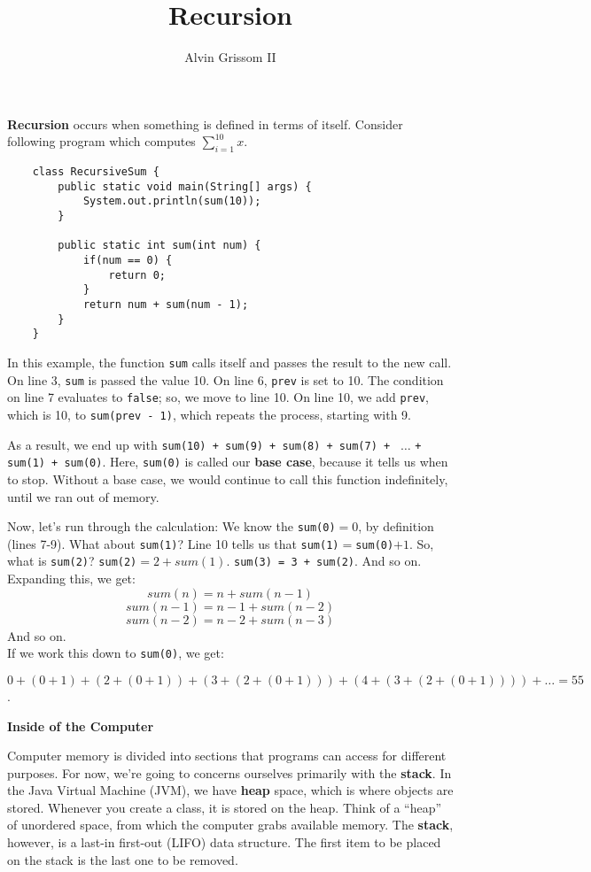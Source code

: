 \documentclass[12pt]{article}
\title{Recursion}
\author{Alvin Grissom II}
\begin{document}
\maketitle

\textbf{Recursion} occurs when something is defined in terms of
itself. Consider following program which computes $\sum_{i=1}^{10} x$.
\begin{verbatim}
    class RecursiveSum {
        public static void main(String[] args) {
            System.out.println(sum(10));
        }
        
        public static int sum(int num) {
            if(num == 0) {
	            return 0;
            }
            return num + sum(num - 1);
        }
    }
\end{verbatim}
In this example, the function \texttt{sum} calls itself and passes the
result to the new call.  On line 3, \texttt{sum} is passed the value
10.  On line 6, \texttt{prev} is set to 10.  The condition on line 7
evaluates to \texttt{false}; so, we move to line 10.  On line 10, we
add \texttt{prev}, which is 10, to \texttt{sum(prev - 1)}, which
repeats the process, starting with 9.

As a result, we end up with \texttt{sum(10) + sum(9) + sum(8) + sum(7)
  + } $\dots$ \texttt{+ sum(1) + sum(0)}.  Here, \texttt{sum(0)} is
called our \textbf{base case}, because it tells us when to stop.
Without a base case, we would continue to call this function
indefinitely, until we ran out of memory.

Now, let's run through the calculation: We know the
\texttt{sum(0)}$=0$, by definition (lines 7-9).  What about
\texttt{sum(1)}?  Line 10 tells us that
\texttt{sum(1)}$=$\texttt{sum(0)}$+1$. So, what is \texttt{sum(2)}?
\texttt{sum(2)}$=2 + sum(1).$ \texttt{sum(3) = 3 + sum(2)}.  And so
on.  Expanding this, we get:
$$sum(n) = n + sum(n-1)$$ 
$$sum(n-1) = n - 1 + sum(n-2)$$ 
$$sum(n-2) = n - 2 + sum(n-3)$$ 
And so on. \\

If we work this down to \texttt{sum(0)}, we get:

$0+(0 + 1) + (2 + (0 + 1)) + (3 + (2 + (0 + 1))) + (4 +(3 + (2 + (0 + 1)))) +\dots = 55$.

\textbf{Inside of the Computer}

Computer memory is divided into sections that programs can access for
different purposes.  For now, we're going to concerns ourselves
primarily with the \textbf{stack}.  In the Java Virtual Machine (JVM),
we have \textbf{heap} space, which is where objects are stored.
Whenever you create a class, it is stored on the heap.  Think of a
``heap'' of unordered space, from which the computer grabs available
memory.  The \textbf{stack}, however, is a last-in first-out (LIFO)
data structure.  The first item to be placed on the stack is the last
one to be removed.
\end{document}
